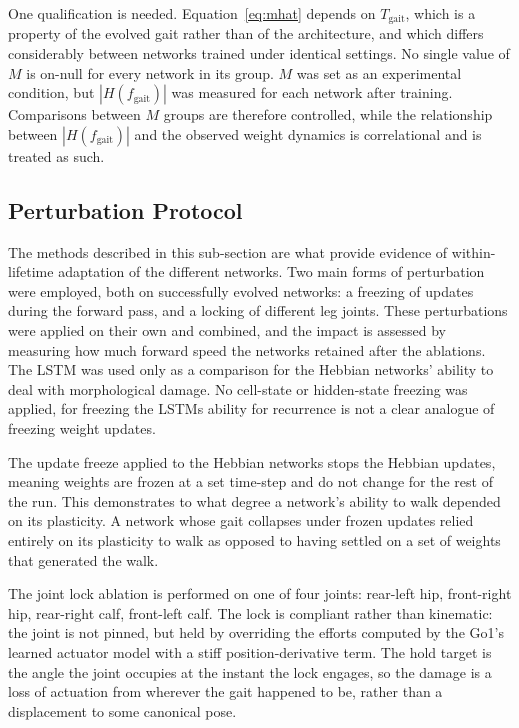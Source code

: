 \documentclass{article} %
\begin{document}
One qualification is needed. Equation~\ref{eq:mhat} depends on
$T_{\text{gait}}$, which is a property of the evolved gait rather than of the
architecture, and which differs considerably between networks trained under
identical settings. No single value of $M$ is on-null for every network in its
group. $M$ was set as an experimental condition, but $|H(f_{\text{gait}})|$ was
measured for each network after training. Comparisons between $M$ groups are
therefore controlled, while the relationship between $|H(f_{\text{gait}})|$ and
the observed weight dynamics is correlational and is treated as such.

\subsection{Perturbation Protocol}
\label{subsec:perturbation_protocol}

The methods described in this sub-section are what provide evidence of within-lifetime adaptation of the different networks. Two main forms of perturbation were employed, both on successfully evolved networks: a freezing of updates during the forward pass, and a locking of different leg joints. These perturbations were applied on their own and combined, and the impact is assessed by measuring how much forward speed the networks retained after the ablations. The LSTM was used only as a comparison for the Hebbian networks' ability to deal with morphological damage. No cell-state or hidden-state freezing was applied, for freezing the LSTMs ability for recurrence is not a clear analogue of freezing weight updates.

The update freeze applied to the Hebbian networks stops the Hebbian updates, meaning weights are frozen at a set time-step and do not change for the rest of the run. This demonstrates to what degree a network's ability to walk depended on its plasticity. A network whose gait collapses under frozen updates relied entirely on its plasticity to walk as opposed to having settled on a set of weights that generated the walk. 

The joint lock ablation is performed on one of four joints: rear-left hip, front-right hip, rear-right calf, front-left calf. The lock is compliant rather than kinematic: the joint is not pinned, but held by overriding the efforts computed by the Go1's learned actuator model with a stiff position-derivative term. The hold target is the angle the joint occupies at the instant the lock engages, so the damage is a loss of actuation from wherever the gait happened to be, rather than a displacement to some canonical pose. 
\end{document}
